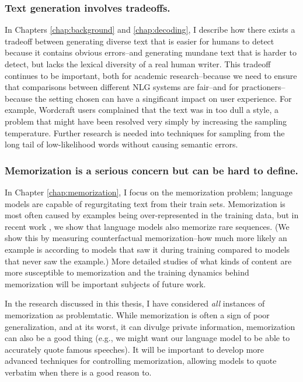 \subsubsection{Text generation involves tradeoffs.}
	In Chapters \ref{chap:background} and \ref{chap:decoding}, I describe how there exists a tradeoff between generating diverse text that is easier for humans to detect because it contains obvious errors--and generating mundane text that is harder to detect, but lacks the lexical diversity of a real human writer.
	This tradeoff continues to be important, both for academic research--because we need to ensure that  comparisons between different NLG systems are fair--and for practioners--because the setting chosen can have a singificant impact on user experience.
	For example, Wordcraft users complained that the text was in too dull a style, a problem that might have been resolved very simply by increasing the sampling temperature.
	Further research is needed into techniques for sampling from the long tail of low-likelihood words without causing semantic errors.

\subsubsection{Memorization is a serious concern but can be hard to define.}
	In Chapter \ref{chap:memorization}, I focus on the memorization problem; language models are capable of regurgitating text from their train sets.
	Memorization is most often caused by examples being over-represented in the training data, but in recent work \citep{zhang2021counterfactual}, we show that language models also memorize rare sequences.
	(We show this by measuring counterfactual memorization--how much more likely an example is according to models that saw it during training compared to models that never saw the example.)
	More detailed studies of what kinds of content are more susceptible to memorization and the training dynamics behind memorization will be important subjects of future work.

	In the research discussed in this thesis, I have considered \textit{all} instances of memorization as problemtatic.
	While memorization is often a sign of poor generalization, and at its worst, it can divulge private information, memorization can also be a good thing (e.g., we might want our language model to be able to accurately quote famous speeches).
	It will be important to develop more advanced techniques for controlling memorization, allowing models to quote verbatim when there is a good reason to.

